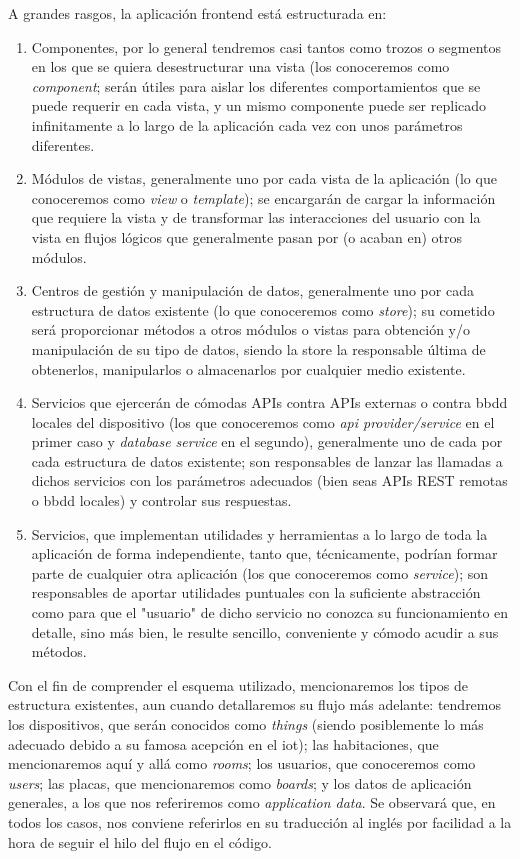 A grandes rasgos, la aplicación frontend está estructurada en:
\begin{enumerate}
 \item Componentes, por lo general tendremos casi tantos como trozos o segmentos en los que se quiera desestructurar una vista (los conoceremos como \textit{component}; serán útiles para aislar los diferentes comportamientos que se puede requerir en cada vista, y un mismo componente puede ser replicado infinitamente a lo largo de la aplicación cada vez con unos parámetros diferentes.
 \item Módulos de vistas, generalmente uno por cada vista de la aplicación (lo que conoceremos como \textit{view} o \textit{template}); se encargarán de cargar la información que requiere la vista y de transformar las interacciones del usuario con la vista en flujos lógicos que generalmente pasan por (o acaban en) otros módulos.
 \item Centros de gestión y manipulación de datos, generalmente uno por cada estructura de datos existente (lo que conoceremos como \textit{store}); su cometido será proporcionar métodos a otros módulos o vistas para obtención y/o manipulación de su tipo de datos, siendo la store la responsable última de obtenerlos, manipularlos o almacenarlos por cualquier medio existente.
 \item Servicios que ejercerán de cómodas APIs contra APIs externas o contra \gls{bbdd} locales del dispositivo (los que conoceremos como \textit{api provider/service} en el primer caso y \textit{database service} en el segundo), generalmente uno de cada por cada estructura de datos existente; son responsables de lanzar las llamadas a dichos servicios con los parámetros adecuados (bien seas APIs REST remotas o \gls{bbdd} locales) y controlar sus respuestas.
 \item Servicios, que implementan utilidades y herramientas a lo largo de toda la aplicación de forma independiente, tanto que, técnicamente, podrían formar parte de cualquier otra aplicación (los que conoceremos como \textit{service}); son responsables de aportar utilidades puntuales con la suficiente abstracción como para que el "usuario" de dicho servicio no conozca su funcionamiento en detalle, sino más bien, le resulte sencillo, conveniente y cómodo acudir a sus métodos.
\end{enumerate}

\vspace{0.5cm}

Con el fin de comprender el esquema utilizado, mencionaremos los tipos de estructura existentes, aun cuando detallaremos su flujo más adelante: tendremos los dispositivos, que serán conocidos como \textit{things} (siendo posiblemente lo más adecuado debido a su famosa acepción en el \gls{iot}); las habitaciones, que mencionaremos aquí y allá como \textit{rooms}; los usuarios, que conoceremos como \textit{users}; las placas, que mencionaremos como \textit{boards}; y los datos de aplicación generales, a los que nos referiremos como \textit{application data}. Se observará que, en todos los casos, nos conviene referirlos en su traducción al inglés por facilidad a la hora de seguir el hilo del flujo en el código.

